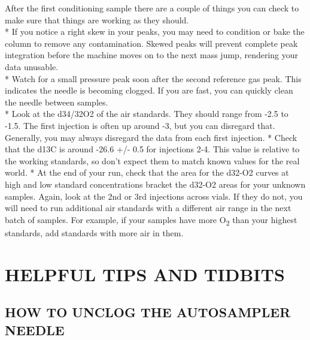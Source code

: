 \documentclass[]{article}
\begin{document}
After the first conditioning sample there are a couple of things you can
check to make sure that things are working as they should.\\
* If you notice a right skew in your peaks, you may need to condition or
bake the column to remove any contamination. Skewed peaks will prevent
complete peak integration before the machine moves on to the next mass
jump, rendering your data unusable.\\
* Watch for a small pressure peak soon after the second reference gas
peak. This indicates the needle is becoming clogged. If you are fast,
you can quickly clean the needle between samples.\\
* Look at the d34/32O2 of the air standards. They should range from -2.5
to -1.5. The first injection is often up around -3, but you can
disregard that. Generally, you may always disregard the data from each
first injection. * Check that the d13C is around -26.6 +/- 0.5 for
injections 2-4. This value is relative to the working standards, so
don't expect them to match known values for the real world. * At the end
of your run, check that the area for the d32-O2 curves at high and low
standard concentrations bracket the d32-O2 areas for your unknown
samples. Again, look at the 2nd or 3rd injections across vials. If they
do not, you will need to run additional air standards with a different
air range in the next batch of samples. For example, if your samples
have more O\textsubscript{2} than your highest standards, add standards
with more air in them.

\section{HELPFUL TIPS AND TIDBITS}\label{helpful-tips-and-tidbits}

\subsection{HOW TO UNCLOG THE AUTOSAMPLER
NEEDLE}\label{how-to-unclog-the-autosampler-needle}
\end{document}
